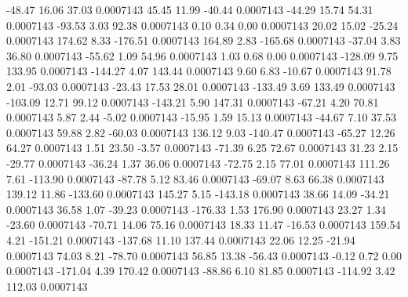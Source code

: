       -48.47       16.06       37.03     0.0007143
       45.45       11.99      -40.44     0.0007143
      -44.29       15.74       54.31     0.0007143
      -93.53        3.03       92.38     0.0007143
        0.10        0.34        0.00     0.0007143
       20.02       15.02      -25.24     0.0007143
      174.62        8.33     -176.51     0.0007143
      164.89        2.83     -165.68     0.0007143
      -37.04        3.83       36.80     0.0007143
      -55.62        1.09       54.96     0.0007143
        1.03        0.68        0.00     0.0007143
     -128.09        9.75      133.95     0.0007143
     -144.27        4.07      143.44     0.0007143
        9.60        6.83      -10.67     0.0007143
       91.78        2.01      -93.03     0.0007143
      -23.43       17.53       28.01     0.0007143
     -133.49        3.69      133.49     0.0007143
     -103.09       12.71       99.12     0.0007143
     -143.21        5.90      147.31     0.0007143
      -67.21        4.20       70.81     0.0007143
        5.87        2.44       -5.02     0.0007143
      -15.95        1.59       15.13     0.0007143
      -44.67        7.10       37.53     0.0007143
       59.88        2.82      -60.03     0.0007143
      136.12        9.03     -140.47     0.0007143
      -65.27       12.26       64.27     0.0007143
        1.51       23.50       -3.57     0.0007143
      -71.39        6.25       72.67     0.0007143
       31.23        2.15      -29.77     0.0007143
      -36.24        1.37       36.06     0.0007143
      -72.75        2.15       77.01     0.0007143
      111.26        7.61     -113.90     0.0007143
      -87.78        5.12       83.46     0.0007143
      -69.07        8.63       66.38     0.0007143
      139.12       11.86     -133.60     0.0007143
      145.27        5.15     -143.18     0.0007143
       38.66       14.09      -34.21     0.0007143
       36.58        1.07      -39.23     0.0007143
     -176.33        1.53      176.90     0.0007143
       23.27        1.34      -23.60     0.0007143
      -70.71       14.06       75.16     0.0007143
       18.33       11.47      -16.53     0.0007143
      159.54        4.21     -151.21     0.0007143
     -137.68       11.10      137.44     0.0007143
       22.06       12.25      -21.94     0.0007143
       74.03        8.21      -78.70     0.0007143
       56.85       13.38      -56.43     0.0007143
       -0.12        0.72        0.00     0.0007143
     -171.04        4.39      170.42     0.0007143
      -88.86        6.10       81.85     0.0007143
     -114.92        3.42      112.03     0.0007143
